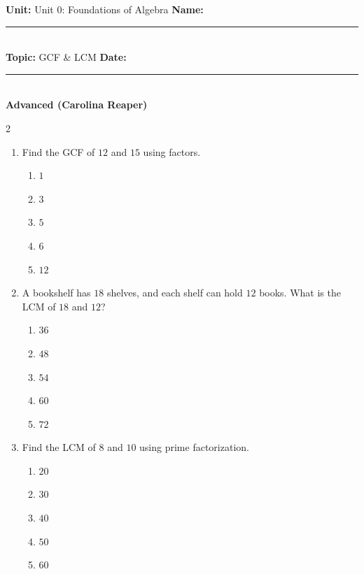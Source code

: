 \documentclass[10pt]{article}
\begin{document}
\enlargethispage{2.5cm}

\begin{tcolorbox}[colback=mainblue!5, colframe=mainblue, sharp corners, boxrule=0.5pt]
    \small \textbf{Unit:} Unit 0: Foundations of Algebra \hfill \textbf{Name:} \rule{3cm}{0.4pt} \\
    \small \textbf{Topic:} GCF & LCM \hfill \textbf{Date:} \rule{2cm}{0.4pt} \\
    \centering \textbf{\large Advanced (Carolina Reaper)}
\end{tcolorbox}

\vspace{0.2cm}

\begin{multicols}{2}
\begin{enumerate}[label=\textbf{Q\arabic*.}, leftmargin=*, itemsep=6pt, parsep=0pt]

  \item \small Find the GCF of $12$ and $15$ using factors.
  \begin{enumerate}[label=(\Alph*), leftmargin=0.6cm, nosep, itemsep=2pt]
    \item $1$
    \item $3$
    \item $5$
    \item $6$
    \item $12$
  \end{enumerate}

  \item \small A bookshelf has $18$ shelves, and each shelf can hold $12$ books. What is the LCM of $18$ and $12$?
  \begin{enumerate}[label=(\Alph*), leftmargin=0.6cm, nosep, itemsep=2pt]
    \item $36$
    \item $48$
    \item $54$
    \item $60$
    \item $72$
  \end{enumerate}

  \item \small Find the LCM of $8$ and $10$ using prime factorization.
  \begin{enumerate}[label=(\Alph*), leftmargin=0.6cm, nosep, itemsep=2pt]
    \item $20$
    \item $30$
    \item $40$
    \item $50$
    \item $60$
  \end{enumerate}


\end{enumerate}
\end{multicols}
\end{document}

